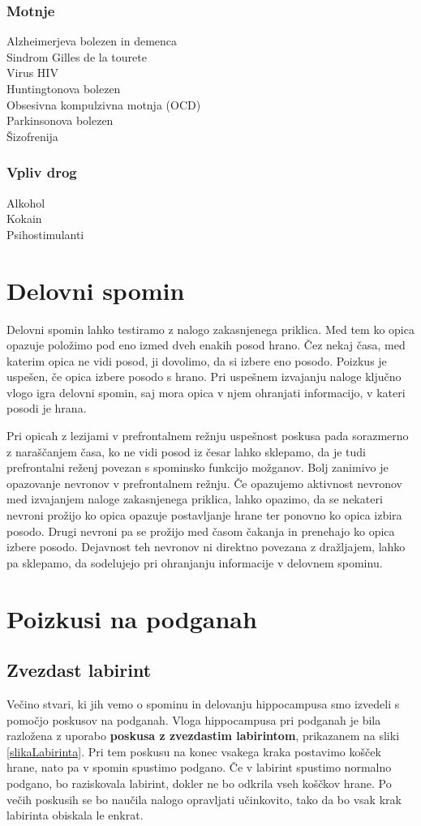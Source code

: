 \documentclass[10pt,a4paper]{article}
\begin{document}
\subsubsection{Motnje}
Alzheimerjeva bolezen in demenca\\
Sindrom Gilles de la tourete\\
Virus HIV\\
Huntingtonova bolezen\\
Obsesivna kompulzivna motnja (OCD)\\
Parkinsonova bolezen\\
Šizofrenija

\subsubsection{Vpliv drog}
Alkohol\\
Kokain\\
Psihostimulanti

\section{Delovni spomin}
Delovni spomin lahko testiramo z nalogo zakasnjenega priklica. Med tem ko opica opazuje položimo pod eno izmed dveh enakih posod hrano. Čez nekaj časa, med katerim opica ne vidi posod, ji dovolimo, da si izbere eno posodo. Poizkus je uspešen, če opica izbere posodo s hrano. Pri uspešnem izvajanju naloge ključno vlogo igra delovni spomin, saj mora opica v njem ohranjati informacijo, v kateri posodi je hrana.

Pri opicah z lezijami v prefrontalnem režnju uspešnost poskusa pada sorazmerno z naraščanjem časa, ko ne vidi posod iz česar lahko sklepamo, da je tudi prefrontalni reženj povezan s spominsko funkcijo možganov. Bolj zanimivo je opazovanje nevronov v prefrontalnem režnju. Če opazujemo aktivnost nevronov med izvajanjem naloge zakasnjenega priklica, lahko opazimo, da se nekateri nevroni prožijo ko opica opazuje postavljanje hrane ter ponovno ko opica izbira posodo. Drugi nevroni pa se prožijo med časom čakanja in prenehajo ko opica izbere posodo. Dejavnost teh nevronov ni direktno povezana z dražljajem, lahko pa sklepamo, da sodelujejo pri ohranjanju informacije v delovnem spominu.

\section{Poizkusi na podganah}
\subsection{Zvezdast labirint}
Večino stvari, ki jih vemo o spominu in delovanju hippocampusa smo izvedeli s pomočjo poskusov na podganah. Vloga hippocampusa pri podganah je bila razložena z uporabo \textbf{poskusa z zvezdastim labirintom}, prikazanem na sliki \ref{slikaLabirinta}. Pri tem poskusu na konec vsakega kraka postavimo košček hrane, nato pa v spomin spustimo podgano. Če v labirint spustimo normalno podgano, bo raziskovala labirint, dokler ne bo odkrila vseh koščkov hrane. Po večih poskusih se bo naučila nalogo opravljati učinkovito, tako da bo vsak krak labirinta obiskala le enkrat.
\end{document}
